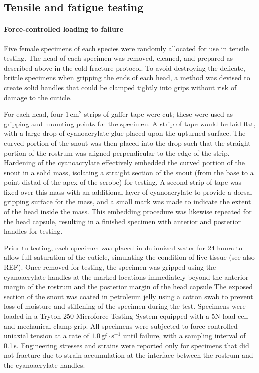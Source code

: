 \documentclass[twocolumn, linenumbers, superscriptaddress, nofootinbib]{revtex4-1}
\begin{document}
		\subsection*{Tensile and fatigue testing}
			\paragraph*{Force-controlled loading to failure}
				Five female specimens of each species were randomly allocated for use in tensile testing.
				The head of each specimen was removed, cleaned, and prepared as described above in the cold-fracture protocol.
				To avoid destroying the delicate, brittle specimens when gripping the ends of each head, a method was devised to create solid handles that could be clamped tightly into grips without risk of damage to the cuticle.
				
				For each head, four $1\,\text{cm}^2$ strips of gaffer tape were cut; these were used as gripping and mounting points for the specimen.
				A strip of tape would be laid flat, with a large drop of cyanoacrylate glue placed upon the upturned surface.
				The curved portion of the snout was then placed into the drop such that the straight portion of the rostrum was aligned perpendicular to the edge of the strip.
				Hardening of the cyanoacrylate effectively embedded the curved portion of the snout in a solid mass, isolating a straight section of the snout (from the base to a point distad of the apex of the scrobe) for testing.
				A second strip of tape was fixed over this mass with an additional layer of cyanoacrylate to provide a dorsal gripping surface for the mass, and a small mark was made to indicate the extent of the head inside the mass.
				This embedding procedure was likewise repeated for the head capsule, resulting in a finished specimen with anterior and posterior handles for testing.
				
				Prior to testing, each specimen was placed in de-ionized water for 24 hours to allow full saturation of the cuticle, simulating the condition of live tissue (see also REF).
				Once removed for testing, the specimen was gripped using the cyanoacrylate handles at the marked locations immediately beyond the anterior margin of the rostrum and the posterior margin of the head capsule
				The exposed section of the snout was coated in petroleum jelly using a cotton swab to prevent loss of moisture and stiffening of the specimen during the test.
				Specimens were loaded in a Tryton 250 Microforce Testing System equipped with a 5N load cell and mechanical clamp grip.
				All specimens were subjected to force-controlled uniaxial tension at a rate of $1.0\,\text{gf}\cdot\text{s}^{-1}$ until failure, with a sampling interval of 0.1\,s.
				Engineering stresses and strains were reported only for specimens that did not fracture due to strain accumulation at the interface between the rostrum and the cyanoacrylate handles.
				
\end{document}
